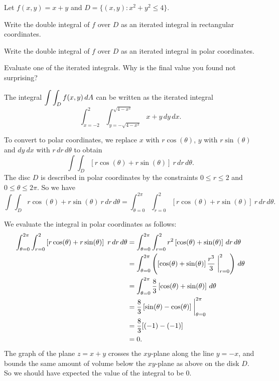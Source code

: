 \begin{activity} \label{A:11.5.4} Let $f(x,y) = x+y$ and $D = \{(x,y) : x^2 + y^2 \leq 4\}$.
    \ba
    \item Write the double integral of $f$ over $D$ as an iterated integral in rectangular coordinates.

    \item Write the double integral of $f$ over $D$ as an iterated integral in polar coordinates.

    \item Evaluate one of the iterated integrals. Why is the final value you found not surprising?


    \ea


\end{activity}
\begin{smallhint}

\end{smallhint}
\begin{bighint}

\end{bighint}
\begin{activitySolution}
    \ba
    \item The integral $\displaystyle \int \int_D f(x,y) \, dA$ can be written as the iterated integral
\[\int_{x=-2}^{2} \int_{y=-\sqrt{4-x^2}}^{\sqrt{4-x^2}} x+y \, dy \, dx.\]

    \item To convert to polar coordinates, we replace $x$ with $r \cos(\theta)$, $y$ with $r \sin(\theta)$ and $dy \ dx$ with $r \, dr \, d\theta$ to obtain
\[\int \int_D \left[ r \cos(\theta) + r \sin(\theta) \right] \ r \, dr \, d\theta.\]
The disc $D$ is described in polar coordinates by the constraints $0 \leq r \leq 2$ and $0 \leq \theta \leq 2\pi$. So we have
\[\int \int_D r\cos(\theta) + r \sin(\theta) \ r \, dr \, d\theta = \int_{\theta=0}^{2\pi} \int_{r=0}^2 \left[r\cos(\theta) + r \sin(\theta)\right] \ r \, dr \, d\theta.\]

    \item We evaluate the integral in polar coordinates as follows:
\begin{align*}
\int_{\theta=0}^{2\pi} \int_{r=0}^2 \left[r\cos(\theta) + r \sin(\theta)\right] \ r \, dr \, d\theta &= \int_{\theta=0}^{2\pi} \int_{r=0}^2 r^2\left[\cos(\theta) + \sin(\theta)\right] \, dr \, d\theta \\
	&= \int_{\theta=0}^{2\pi} \left( \left[\cos(\theta) + \sin(\theta)\right]\frac{r^3}{3}\biggm|_{r=0}^2 \right) \, d\theta \\
	&= \int_{\theta=0}^{2\pi} \frac{8}{3} \left[ \cos(\theta) + \sin(\theta) \right] \, d\theta \\
	&= \frac{8}{3}\left[\sin(\theta) - \cos(\theta)\right]\biggm|_{\theta=0}^{2\pi} \\
	&= \frac{8}{3}[(-1)-(-1)] \\
	&= 0.
\end{align*}
The graph of the plane $z=x+y$ crosses the $xy$-plane along the line $y=-x$, and bounds the same amount of volume below the $xy$-plane as above on the disk $D$. So we should have expected the value of the integral to be $0$.

    \ea
\end{activitySolution}
\aftera

